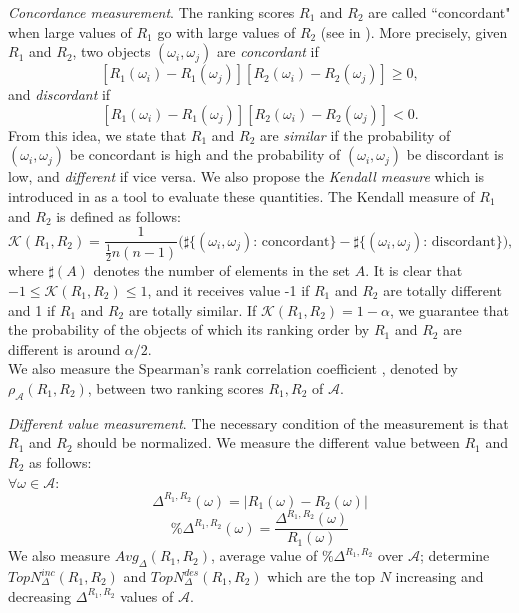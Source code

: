 \documentclass[10pt,leqno,twoside]{article}
\begin{document}
\textit{Concordance measurement}. The ranking scores $R_1$ and $R_2$ are called ``concordant" when large values of $R_1$ go with large values of $R_2$ (see in \cite{Nelsen2006}). More precisely, given $R_1$ and $R_2$, two objects $(\omega_i , \omega_j)$ are \emph{concordant} if
\[[R_1(\omega_i)-R_1(\omega_j)][R_2(\omega_i)-R_2(\omega_j)] \geqslant 0,\]
and \emph{discordant} if
\[[R_1(\omega_i)-R_1(\omega_j)][R_2(\omega_i)-R_2(\omega_j)] < 0.\]
From this idea, we state that $R_1$ and $R_2$ are \emph{similar} if the probability of $(\omega_i,\omega_j)$ be concordant is high and the probability of $(\omega_i,\omega_j)$ be discordant is low, and \emph{different} if vice versa. We also propose the \emph{Kendall measure} which is introduced in \cite{Kendall1938} as a tool to evaluate these quantities. The Kendall measure of $R_1$ and $R_2$ is defined as follows:
\begin{equation}
\mathcal{K}(R_1,R_2) = \frac{1}{\frac{1}{2}n(n-1)}\Big(\sharp\big\{(\omega_i,\omega_j) \text{: concordant}\big\} - \sharp\big\{(\omega_i,\omega_j) \text{: discordant}\big\}\Big),
\end{equation}
where $\sharp(A)$ denotes the number of elements in the set $A$. It is clear that $-1 \leqslant \mathcal{K}(R_1,R_2) \leqslant 1$, and it receives value -1 if $R_1$ and $R_2$ are totally different and 1 if $R_1$ and $R_2$ are totally similar. If $\mathcal{K}(R_1,R_2) = 1-\alpha$, we guarantee that the probability of the objects of which its ranking order by $R_1$ and $R_2$ are different is around $\alpha/2$.
\\
We also measure the Spearman's rank correlation coefficient \cite{spearman}, denoted by $\rho_\mathcal{A}(R_1,R_2)$, between two ranking scores $R_1,R_2$ of $\mathcal{A}$.

\textit{Different value measurement}. The necessary condition of the measurement is that $R_1$ and $R_2$ should be normalized. We measure the different value between $R_1$ and $R_2$ as follows:\\
$\forall \omega \in \mathcal{A}:$
\begin{equation}
 \Delta^{R_1,R_2}(\omega)= |R_1(\omega) - R_2(\omega)| 
\end{equation} 
 \begin{equation}
 \%\Delta^{R_1,R_2}(\omega)= \frac{\Delta^{R_1,R_2}(\omega)}{R_1(\omega)}
\end{equation} 
We also measure $Avg_{\Delta}(R_1,R_2)$, average value of $\%\Delta^{R_1,R_2}$ over $\mathcal{A}$; determine $TopN^{inc}_{\Delta}(R_1,R_2)$ and $TopN^{des}_{\Delta}(R_1,R_2)$  which are the top $N$  increasing and decreasing  $\Delta^{R_1,R_2}$ values of $\mathcal{A}$.
\end{document}
